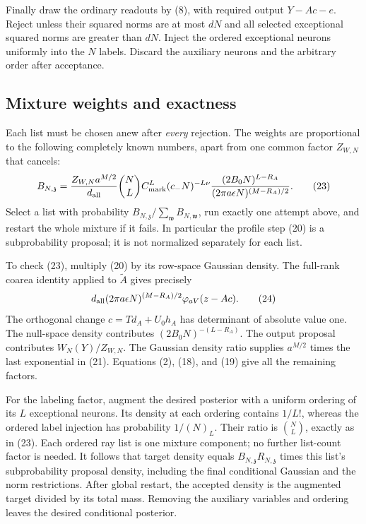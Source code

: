 \documentclass[11pt]{article}
\begin{document}
Finally draw the ordinary readouts by (8), with required output
$Y-Ac-e$. Reject unless their squared norms are at most $dN$ and all
selected exceptional squared norms are greater than $dN$. Inject the
ordered exceptional neurons uniformly into the $N$ labels. Discard the
auxiliary neurons and the arbitrary order after acceptance.

\subsection{Mixture weights and exactness}
Each list must be chosen anew after \emph{every} rejection. The weights
are proportional to the following completely known numbers, apart from
one common factor $Z_{W,N}$ that cancels:
\[
 B_{N,\mathfrak z}=
 \frac{Z_{W,N}a^{M/2}}{d_{\rm all}}\binom NL
 C_{\rm mark}^L(c_-N)^{-L\nu}
 \frac{(2B_0N)^{L-R_A}}
      {(2\pi a\epsilon N)^{(M-R_A)/2}}.                \tag{23}
\]
Select a list with probability $B_{N,\mathfrak z}/\sum_{\mathfrak w}
 B_{N,\mathfrak w}$, run exactly one attempt above, and restart the
whole mixture if it fails. In particular the profile step (20) is a
subprobability proposal; it is not normalized separately for each list.

To check (23), multiply (20) by its row-space Gaussian density. The
full-rank coarea identity applied to $\widetilde A$ gives precisely
\[
 d_{\rm all}(2\pi a\epsilon N)^{(M-R_A)/2}
                       \varphi_{aV}(z-Ac).             \tag{24}
\]
The orthogonal change $c=T d_A+U_0h_A$ has determinant of absolute value
one. The null-space density contributes $(2B_0N)^{-(L-R_A)}$.
The output proposal contributes $W_N(Y)/Z_{W,N}$.
The Gaussian density ratio supplies $a^{M/2}$ times the last exponential
in (21). Equations (2), (18), and (19) give all the remaining factors.

For the labeling factor, augment the desired posterior with a uniform
ordering of its $L$ exceptional neurons. Its density at each ordering
contains $1/L!$, whereas the ordered label injection has probability
$1/(N)_L$. Their ratio is $\binom NL$, exactly as in (23).
Each ordered ray list is one mixture component; no further list-count
factor is needed. It follows that target density equals
$B_{N,\mathfrak z}R_{N,\mathfrak z}$ times this list's subprobability
proposal density, including the final conditional Gaussian and the
norm restrictions. After global restart, the accepted density is the
augmented target divided by its total mass. Removing the auxiliary
variables and ordering leaves the desired conditional posterior.
\end{document}
